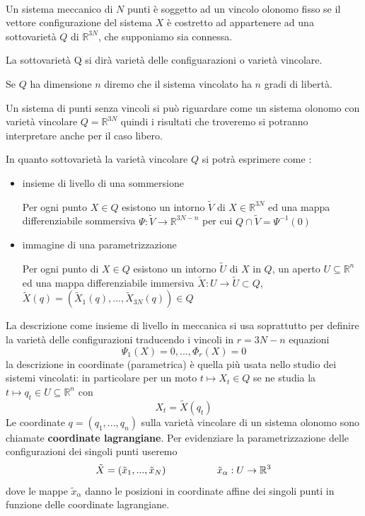 \documentclass[11pt,a4paper,twoside]{book}
\newenvironment{definizione}[1][\empty]{\begin{Definizione}{
\ifx\empty#1\relax\else\mdseries\itshape#1\\\fi
}{}}{\end{Definizione}}
\theoremstyle{esss}
\theoremstyle{dotless}
\numberwithin{equation}{section} %
\begin{document}
\begin{definizione}
Un sistema meccanico di $N$ punti è soggetto ad un vincolo olonomo fisso se il vettore configurazione del sistema $X$ è costretto ad appartenere ad una sottovarietà $Q$ di $\mathbb{R}^{3N}$, che supponiamo sia connessa.

La sottovarietà Q si dirà varietà delle configuarazioni o varietà vincolare.

Se $Q$ ha dimensione $n$ diremo che il sistema vincolato ha $n$ gradi di libertà.
\end{definizione}

Un sistema di punti senza vincoli si può riguardare come un sistema olonomo con varietà vincolare $Q=\mathbb{R}^{3N}$ quindi i risultati che troveremo si potranno interpretare anche per il caso libero.

In quanto sottovarietà la varietà vincolare $Q$ si potrà esprimere come :\begin{itemize}
\item insieme di livello di una sommersione

 Per ogni punto $X\in Q$ esistono un intorno $\tilde{V}$ di $X\in\mathbb{R}^{3N}$ ed una mappa differenziabile sommersiva $\Psi:\tilde{V}\rightarrow\mathbb{R}^{3N-n}$ per cui $Q\cap\tilde{V}=\Psi^{-1}(0)$
\item immagine di una parametrizzazione

 Per ogni punto di $X\in Q$ esistono un intorno $\tilde{U}$ di $X$ in $Q$, un aperto $U\subseteq\mathbb{R}^{n}$ ed una mappa differenziabile immersiva $\tilde{X}:U\rightarrow\tilde{U}\subset Q$, $\tilde{X}(q)=(\tilde{X}_1(q),...,\tilde{X}_{3N}(q))\in Q$
\end{itemize}


La descrizione come insieme di livello in meccanica si usa soprattutto per definire la varietà delle configurazioni traducendo i vincoli in $r=3N-n$ equazioni
\[\Psi_1(X)=0 ,..., \Phi_r(X)=0\]
la descrizione in coordinate (parametrica) è quella più usata nello studio dei sistemi vincolati: in particolare per un moto $t\mapsto X_t\in Q$ se ne studia la $t\mapsto q_t\in U\subseteq\mathbb{R}^n$ con \[ X_t=\tilde{X}(q_t)
\]
Le coordinate $q=(q_1,...,q_n)$ sulla varietà vincolare di un sistema olonomo sono chiamate \textbf{coordinate lagrangiane}. Per evidenziare la parametrizzazione delle configurazioni dei singoli punti useremo
\[
\tilde{X}=(\tilde{x}_1,...,\tilde{x}_N) \hspace{0.15\linewidth} \tilde{x}_\alpha:U\rightarrow\mathbb{R}^3
\]
dove le mappe $\tilde{x}_\alpha$ danno le posizioni in coordinate affine dei singoli punti in funzione delle coordinate lagrangiane.
\end{document}
